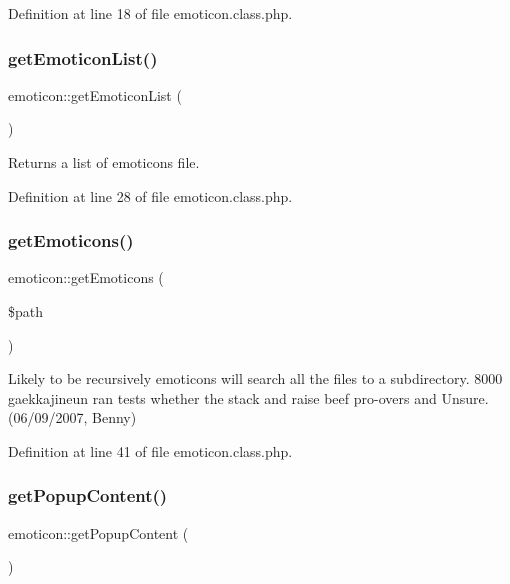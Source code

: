 Definition at line 18 of file emoticon.\+class.\+php.

\mbox{\label{classemoticon_ac8b67c22af9daf48fb1d95f4fea2d07e}} 
\subsubsection{\texorpdfstring{get\+Emoticon\+List()}{getEmoticonList()}}
{\footnotesize\ttfamily emoticon\+::get\+Emoticon\+List (\begin{DoxyParamCaption}{ }\end{DoxyParamCaption})}



Returns a list of emoticons file. 



Definition at line 28 of file emoticon.\+class.\+php.

\mbox{\label{classemoticon_a95bdb6fcf406fc9882332a3b5f01542c}} 
\subsubsection{\texorpdfstring{get\+Emoticons()}{getEmoticons()}}
{\footnotesize\ttfamily emoticon\+::get\+Emoticons (\begin{DoxyParamCaption}\item[{}]{\$path }\end{DoxyParamCaption})}



Likely to be recursively emoticons will search all the files to a subdirectory. 8000 gaekkajineun ran tests whether the stack and raise beef pro-\/overs and Unsure. (06/09/2007, Benny) 



Definition at line 41 of file emoticon.\+class.\+php.

\mbox{\label{classemoticon_afe901b31a28bed049ed8d553e996736d}} 
\subsubsection{\texorpdfstring{get\+Popup\+Content()}{getPopupContent()}}
{\footnotesize\ttfamily emoticon\+::get\+Popup\+Content (\begin{DoxyParamCaption}{ }\end{DoxyParamCaption})}



